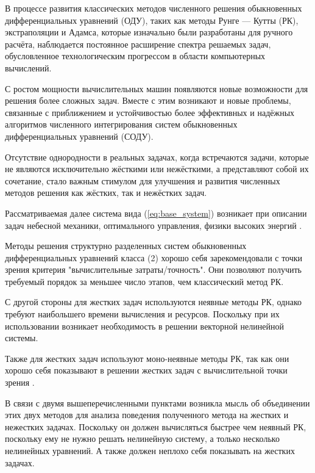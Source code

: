\documentclass[a4paper,article,14pt]{extarticle}
\begin{document}


\tableofcontents
\pagebreak

В процессе развития классических методов численного решения обыкновенных дифференциальных уравнений (ОДУ), таких как методы Рунге — Кутты (РК), экстраполяции и Адамса, которые изначально были разработаны для ручного расчёта, наблюдается постоянное расширение спектра решаемых задач, обусловленное технологическим прогрессом в области компьютерных вычислений.

С ростом мощности вычислительных машин появляются новые возможности для решения более сложных задач. Вместе с этим возникают и новые проблемы, связанные с приближением и устойчивостью более эффективных и надёжных алгоритмов численного интегрирования систем обыкновенных дифференциальных уравнений (СОДУ).

Отсутствие однородности в реальных задачах, когда встречаются задачи, которые не являются исключительно жёсткими или нежёсткими, а представляют собой их сочетание, стало важным стимулом для улучшения и развития численных методов решения как жёстких, так и нежёстких задач.

Рассматриваемая далее система вида (\ref{eq:base_system}) возникает при описании задач небесной механики, оптимального управления, физики высоких энергий \cite{OlemskoyBook2009}.
\pagebreak

Методы решения структурно разделенных систем обыкновенных дифференциальных уравнений класса (2) хорошо себя зарекомендовали с точки зрения критерия "вычислительные затраты/точность". Они позволяют получить требуемый порядок за меньшее число этапов, чем классический метод РК.

С другой стороны для жестких задач используются неявные методы РК, однако требуют наибольшего времени вычисления и ресурсов. Поскольку при их использовании возникает необходимость в решении векторной нелинейной системы.

Также для жестких задач используют моно-неявные методы РК, так как они хорошо себя показывают в решении жестких задач с вычислительной точки зрения \cite{mirk}.

В связи с двумя вышеперечисленными пунктами возникла мысль об объединении этих двух методов для анализа поведения полученного метода на жестких и нежестких задачах. Поскольку он должен вычисляться быстрее чем неявный РК, поскольку ему не нужно решать нелинейную систему, а только несколько нелинейных уравнений. А также должен неплохо себя показывать на жестких задачах.
\end{document}
